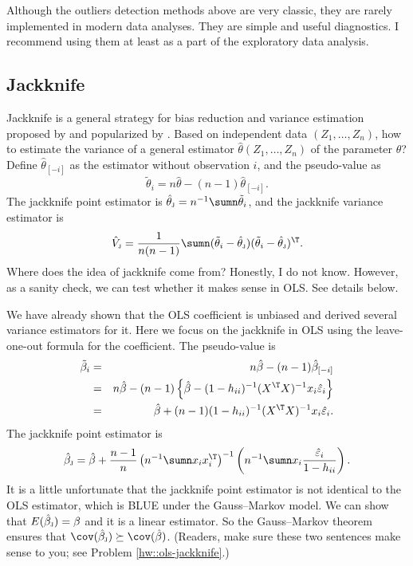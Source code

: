 Although the outliers detection methods above are very classic, they are rarely implemented in modern data analyses. They are simple and useful diagnostics. I recommend using them at least as a part of the exploratory data analysis.  

 
 
\subsection{Jackknife} 
 

Jackknife is a general strategy for bias reduction and variance estimation proposed by \citet{quenouille1949approximate, quenouille1956notes} and popularized by  \citet{tukey1958bias}. Based on independent data $(Z_1,\ldots,Z_n)$, how to estimate the variance of a general estimator $\hat{\theta}(Z_1,\ldots,Z_n)$ of the parameter $\theta$? Define $\hat{\theta}_{[-i]}$ as the estimator without observation $i$, and the pseudo-value as 
$$
\tilde{\theta}_i = n \hat{\theta} - (n-1) \hat{\theta}_{[-i]} .
$$ 
The jackknife point estimator is $\hat{\theta}_\textsc{j} = n^{-1} \sumn \tilde{\theta}_i$, and the jackknife variance estimator is 
 $$
\hat{V}_\textsc{j}  = \frac{1}{n(n-1)}\sumn (\tilde{\theta}_i  - \hat{\theta}_\textsc{j}  )(\tilde{\theta}_i - \hat{\theta}_\textsc{j}  )^{\T}.
 $$
Where does the idea of jackknife come from? Honestly, I do not know. However, as a sanity check, we can test whether it makes sense in OLS. See details below.   
 


We have already shown that the OLS coefficient is unbiased and derived several variance estimators for it. 
Here we focus on the jackknife in OLS using the leave-one-out formula for the coefficient. The pseudo-value is
\begin{eqnarray*}
\tilde{\beta}_i &=& n \hat{\beta} - (n-1) \hat{\beta}_{[-i]} \\
&=& n \hat{\beta} - (n-1) \left\{ \hat{\beta}-(1-h_{ii})^{-1}(X^{\T}X)^{-1}x_{i}\hat{\varepsilon}_{i} \right\} \\
&=& \hat{\beta}  + (n-1)  (1-h_{ii})^{-1}(X^{\T}X)^{-1}x_{i}\hat{\varepsilon}_{i} .
\end{eqnarray*}
The jackknife point estimator is 
$$
\hat{\beta}_\textsc{j} = \hat{\beta} + \frac{n-1}{n} \left( n^{-1} \sumn x_i x_i^{\T} \right)^{-1} 
\left(   n^{-1} \sumn x_{i}  \frac{  \hat{\varepsilon}_{i} }{ 1-h_{ii} }   \right) .
$$
 It is a little unfortunate that the jackknife point estimator is not identical to the OLS estimator, which is BLUE under the Gauss--Markov model.  
We can show that  $E(\hat{\beta}_\textsc{j} )  = \beta$ and it is a linear estimator. So the Gauss--Markov theorem ensures that $\cov( \hat{\beta}_\textsc{j} ) \succeq \cov( \hat{\beta})$. (Readers, make sure these two sentences make sense to you; see Problem \ref{hw::ols-jackknife}.)
 
